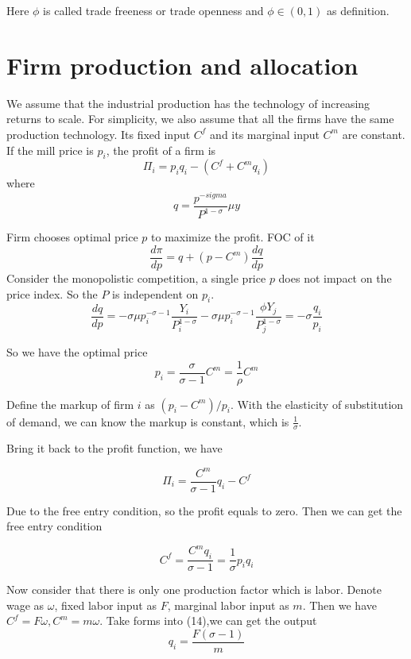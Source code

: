 \documentclass{article}
\begin{document}
Here $\phi$ is called trade freeness or trade openness and $\phi \in (0,1) $ as definition.

\section{Firm production and allocation}

We assume that the industrial production has the technology of increasing returns to scale. For simplicity, we also assume that all the firms have the same production technology. Its fixed input $C^f$ and its marginal input $C^m$ are constant. If the mill price is $p_i$, the profit of a firm is
\begin{equation}
    \Pi_i = p_i q_i - (C^f + C^m q_i)
\end{equation}
where
$$q= \frac{p^{-sigma}}{P^{1-\sigma}}\mu y$$

Firm chooses optimal price $p$ to maximize the profit. FOC of it
$$\frac{d\pi}{dp} = q+(p -C^m)\frac{dq}{dp}$$
Consider the monopolistic competition, a single price $p$ does not impact on the price index. So the $P$ is independent on $p_i$.
$$\frac{dq}{dp} = -\sigma \mu p_i^{-\sigma -1 } \frac{Y_i}{P_i^{1-\sigma}} - \sigma \mu p_i^{-\sigma -1 } \frac{\phi Y_j}{P_j^{1-\sigma}} = -\sigma \frac{q_i}{p_i}$$

So we have the optimal price
\begin{equation}
    p_i = \frac{\sigma}{\sigma -1 } C^m = \frac{1}{\rho} C^m
\end{equation}

Define the markup of firm $i$ as $(p_i-C^m)/p_i$. With the elasticity of substitution of demand, we can know the markup is constant, which is $\frac{1}{\sigma}$.

Bring it back to the profit function, we have 

\begin{equation}
    \Pi_i = \frac{C^m}{\sigma -1} q_i - C^f
\end{equation}

Due to the free entry condition, so the profit equals to zero. Then we can get the free entry condition

\begin{equation}
    C^f = \frac{C^m q_i}{ \sigma - 1 } = \frac{1}{\sigma} p_i q_i
\end{equation}

Now consider that there is only one production factor which is labor. Denote wage as $\omega$, fixed labor input as $F$, marginal labor input as $m$. Then we have $C^f=F \omega , C^m = m\omega$. Take forms into (14),we can get the output
\begin{equation}
    q_i = \frac{F(\sigma -1)}{m}
\end{equation}
\end{document}

